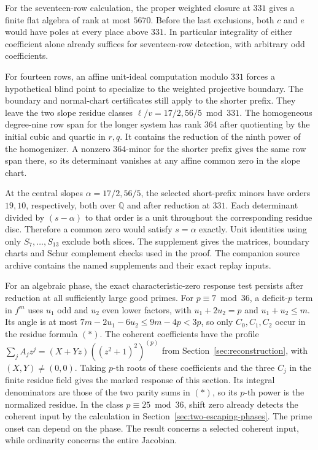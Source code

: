 \documentclass[11pt]{article}
\begin{document}
For the seventeen-row calculation, the proper weighted closure
at \(331\) gives a finite flat algebra of rank at most \(5670\).
Before the last exclusions, both \(c\) and \(e\) would have
poles at every place above \(331\). In particular integrality
of either coefficient alone already suffices for seventeen-row
detection, with arbitrary odd coefficients.

For fourteen rows, an affine unit-ideal computation modulo
\(331\) forces a hypothetical blind point to specialize to the
weighted projective boundary. The boundary and normal-chart
certificates still apply to the shorter prefix. They leave the
two slope residue classes \(\ell/v=17/2,56/5\bmod331\).
The homogeneous degree-nine row span for the longer system has
rank \(364\) after quotienting by the initial cubic and quartic
in \(r,q\). It contains the reduction of the ninth power of the
homogenizer. A nonzero \(364\)-minor for the shorter prefix
gives the same row span there, so its determinant vanishes at
any affine common zero in the slope chart.

At the central slopes \(\alpha=17/2,56/5\), the selected
short-prefix minors have orders \(19,10\), respectively,
both over \(\mathbb Q\) and after reduction at \(331\).
Each determinant divided by \((s-\alpha)\) to that order is
a unit throughout the corresponding residue disc. Therefore
a common zero would satisfy \(s=\alpha\) exactly. Unit identities
using only \(S_7,\ldots,S_{13}\) exclude both slices.
The supplement gives the matrices, boundary charts and Schur
complement checks used in the proof. The companion source archive
contains the named supplements and their exact replay inputs.

For an algebraic phase, the exact characteristic-zero response
test persists after reduction at all sufficiently large good primes.
For \(p\equiv7\bmod36\), a deficit-\(p\) term in \(f^m\) uses
\(u_1\) odd and \(u_2\) even lower factors, with
\(u_1+2u_2=p\) and \(u_1+u_2\le m\). Its angle is at most
\(7m-2u_1-6u_2\le9m-4p<3p\), so only \(C_0,C_1,C_2\) occur
in the residue formula \((*)\). The coherent coefficients have the
profile \(\sum_j A_j z^j=(X+Yz)((z^2+1)^2)^{(p)}\) from
Section~\ref{sec:reconstruction}, with \((X,Y)\ne(0,0)\).
Taking \(p\)-th roots of these coefficients and the three \(C_j\) in
the finite residue field gives the marked response of this section.
Its integral denominators are those of the two parity sums in \((*)\),
so its \(p\)-th power is the normalized residue. In the class
\(p\equiv25\bmod36\), shift zero already detects the coherent input
by the calculation in Section~\ref{sec:two-escaping-phases}. The prime onset
can depend on the phase. The result concerns a selected coherent
input, while ordinarity concerns the entire Jacobian.
\end{document}

